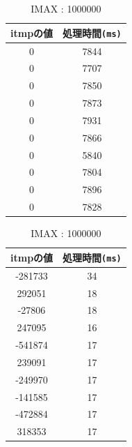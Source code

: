 \documentclass[10pt]{jarticle}
\begin{document}
\begin{table}
	\caption{IMAX : 1000000}
	\label{table:1000000}
	\begin{minipage}{.45\textwidth}
		\centering
		\label{table:millionsemaari}
		\begin{tabular}{|c|c|}
			\hline
			itmpの値 & 処理時間\verb|(ms)|\\
			\hline
			0 & 7844\\
			0 & 7707\\
			0 & 7850\\
			0 & 7873\\
			0 & 7931\\
			0 & 7866\\
			0 & 5840\\
			0 & 7804\\
			0 & 7896\\
			0 & 7828\\
			\hline
		\end{tabular}
	\end{minipage}
	\begin{minipage}{.45\textwidth}
		\centering
		\label{table:millionsemanasi}
		\begin{tabular}{|c|c|}
			\hline
			itmpの値 & 処理時間\verb|(ms)|\\
			\hline
			-281733 & 34 \\
			292051 & 18 \\
			-27806 & 18 \\
			247095 & 16 \\
			-541874 & 17 \\
			239091 & 17 \\
			-249970 & 17 \\
			-141585 & 17 \\
			-472884 & 17 \\
			318353 & 17 \\
			\hline
		\end{tabular}
	\end{minipage}
\end{table}
\end{document}
